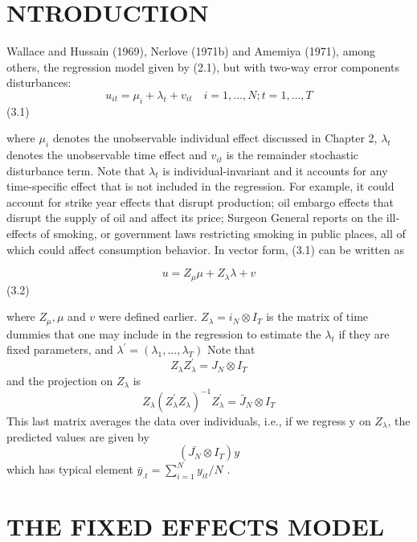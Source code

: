 \documentclass[
]{book}
\begin{document}
\hypertarget{ntroduction}{%
\section{NTRODUCTION}\label{ntroduction}}

Wallace and Hussain (1969), Nerlove (1971b) and Amemiya (1971), among others, the regression model given by (2.1), but with two-way error components disturbances: \begin{equation}
u_{i t}=\mu_{i}+\lambda_{t}+v_{i t} \quad i=1, \ldots, N ; t=1, \ldots, T
\end{equation} (3.1)

where \(\mu_i\) denotes the unobservable individual effect discussed in Chapter 2, \(\lambda_t\) denotes the unobservable time effect and \(v_{it}\) is the remainder stochastic disturbance term. Note that \(\lambda_t\) is individual-invariant and it accounts for any time-specific effect that is not included in the regression. For example, it could account for strike year effects that disrupt production; oil embargo effects that disrupt the supply of oil and affect its price; Surgeon General reports on the ill-effects of smoking, or government laws restricting smoking in public places, all of which could affect consumption behavior. In vector form, (3.1) can be written as

\begin{equation}
u=Z_{\mu} \mu+Z_{\lambda} \lambda+v
\end{equation} (3.2)

where \(Z_\mu, \mu\) and \(v\) were defined earlier. \(Z_\lambda = i_N \otimes I_T\) is the matrix of time dummies that one may include in the regression to estimate the \(\lambda_t\) if they are fixed parameters, and \(\lambda^{\prime}= (\lambda_1, ..., \lambda_T )\) Note that \[Z_\lambda Z_\lambda^ {\prime}=J_N \otimes I_T \] and the projection on \(Z_{\lambda}\) is \[Z_{\lambda}\left(Z_{\lambda}^{\prime} Z_{\lambda}\right)^{-1} Z_{\lambda}^{\prime}=\bar{J}_{N} \otimes I_T  \] This last matrix averages the data over individuals, i.e., if we regress y on \(Z_\lambda\), the predicted values are given by \[ (\bar {J_N} \otimes I_T)y \] which has typical element \(\bar{y}_{. t}=\sum_{i=1}^{N} y_{i t} / N\) .

\hypertarget{the-fixed-effects-model-1}{%
\section{THE FIXED EFFECTS MODEL}\label{the-fixed-effects-model-1}}
\end{document}
